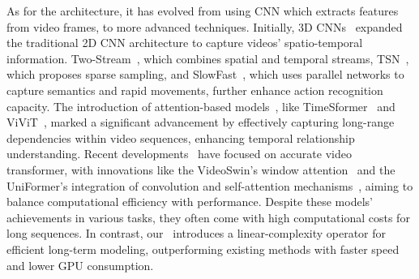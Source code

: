 As for the architecture,
it has evolved from using CNN which extracts features from video frames, to more advanced techniques.
Initially, 3D CNNs~\cite{c3d,i3d,x3d,r(2+1)d} expanded the traditional 2D CNN architecture to capture videos' spatio-temporal information. 
Two-Stream~\cite{two_stream}, which combines spatial and temporal streams, 
TSN~\cite{tsn}, which proposes sparse sampling,
and SlowFast~\cite{slowfast}, which uses parallel networks to capture semantics and rapid movements, further enhance action recognition capacity. 
The introduction of attention-based models~\cite{timesformer,vivit,motionformer,stam,morphmlp}, like TimeSformer~\cite{timesformer} and ViViT~\cite{vivit}, 
marked a significant advancement by effectively capturing long-range dependencies within video sequences, 
enhancing temporal relationship understanding. Recent developments~\cite{uniformer,uniformerv2,Wang2022InternVideoGV,video_swin} have focused on accurate video transformer, with innovations like the VideoSwin's window attention~\cite{video_swin} and the UniFormer's integration of convolution and self-attention mechanisms~\cite{uniformer}, 
aiming to balance computational efficiency with performance. 
Despite these models' achievements in various tasks, 
they often come with high computational costs for long sequences. 
In contrast,
our \ModelName\  introduces a linear-complexity operator for efficient long-term modeling, outperforming existing methods with faster speed and lower GPU consumption.

